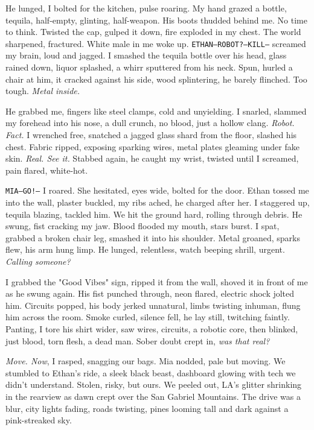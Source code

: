 \documentclass[12pt,oneside]{book} %
\newcommand{\note}[1]{\texttt{#1}}
\begin{document}
He lunged, I bolted for the kitchen, pulse roaring. My hand grazed a bottle, tequila, half-empty, glinting, half-weapon. His boots thudded behind me. No time to think. Twisted the cap, gulped it down, fire exploded in my chest. The world sharpened, fractured. White male in me woke up. \note{ETHAN—ROBOT?—KILL—} screamed my brain, loud and jagged. I smashed the tequila bottle over his head, glass rained down, liquor splashed, a whirr sputtered from his neck. Spun, hurled a chair at him, it cracked against his side, wood splintering, he barely flinched. Too tough. \textit{Metal inside.}

He grabbed me, fingers like steel clamps, cold and unyielding. I snarled, slammed my forehead into his nose, a dull crunch, no blood, just a hollow clang. \textit{Robot. Fact.} I wrenched free, snatched a jagged glass shard from the floor, slashed his chest. Fabric ripped, exposing sparking wires, metal plates gleaming under fake skin. \textit{Real. See it.} Stabbed again, he caught my wrist, twisted until I screamed, pain flared, white-hot.

\note{MIA—GO!—} I roared. She hesitated, eyes wide, bolted for the door. Ethan tossed me into the wall, plaster buckled, my ribs ached, he charged after her. I staggered up, tequila blazing, tackled him. We hit the ground hard, rolling through debris. He swung, fist cracking my jaw. Blood flooded my mouth, stars burst. I spat, grabbed a broken chair leg, smashed it into his shoulder. Metal groaned, sparks flew, his arm hung limp. He lunged, relentless, watch beeping shrill, urgent. \textit{Calling someone?}

I grabbed the "Good Vibes" sign, ripped it from the wall, shoved it in front of me as he swung again. His fist punched through, neon flared, electric shock jolted him. Circuits popped, his body jerked unnatural, limbs twisting inhuman, flung him across the room. Smoke curled, silence fell, he lay still, twitching faintly. Panting, I tore his shirt wider, saw wires, circuits, a robotic core, then blinked, just blood, torn flesh, a dead man. Sober doubt crept in, \textit{was that real?}

\textit{Move. Now}, I rasped, snagging our bags. Mia nodded, pale but moving. We stumbled to Ethan’s ride, a sleek black beast, dashboard glowing with tech we didn’t understand. Stolen, risky, but ours. We peeled out, LA’s glitter shrinking in the rearview as dawn crept over the San Gabriel Mountains. The drive was a blur, city lights fading, roads twisting, pines looming tall and dark against a pink-streaked sky.
\end{document}
